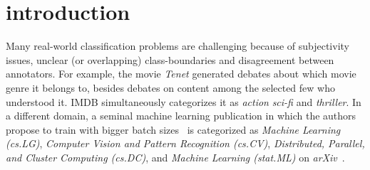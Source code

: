 
\section{introduction}
\label{sec:org662677c}


Many real-world classification problems are challenging because of
subjectivity issues, unclear (or overlapping) class-boundaries and
disagreement between annotators. For example, the movie \textit{Tenet} generated 
debates about which movie genre it belongs to, besides debates on content among the selected few who understood it. IMDB simultaneously categorizes it as \textit{action}
\textit{sci-fi} and \textit{thriller}. In a different domain, a seminal machine learning publication in which the authors propose to train with bigger batch sizes~\cite{bigBS} is categorized as \textit{Machine Learning (cs.LG)},
\textit{Computer Vision and Pattern Recognition (cs.CV)}, \textit{Distributed,
Parallel, and Cluster Computing (cs.DC)}, and \textit{Machine Learning
(stat.ML)} on \textit{arXiv}~\cite{bigBSArxiv}.



